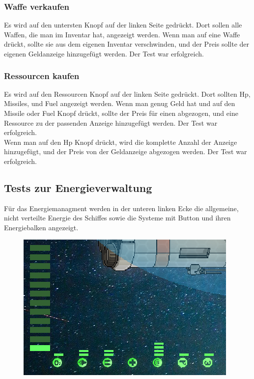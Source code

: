 \documentclass[fontsize=12pt,paper=a4,twoside]{scrartcl}
\begin{document}
\subsubsection{Waffe verkaufen}
Es wird auf den untersten Knopf auf der linken Seite gedrückt. Dort sollen alle Waffen, die man im Inventar hat, angezeigt werden. Wenn man auf eine Waffe drückt, sollte sie aus dem eigenen Inventar verschwinden, und der Preis sollte der eigenen Geldanzeige hinzugefügt werden.  Der Test war erfolgreich. \\
\subsubsection{Ressourcen kaufen}
Es wird auf den Ressourcen Knopf auf der linken Seite gedrückt. Dort sollten Hp, Missiles, und Fuel angezeigt werden. Wenn man genug Geld hat und auf den Missile oder Fuel Knopf drückt, sollte der Preis für einen abgezogen, und eine Ressource zu der passenden Anzeige hinzugefügt werden.  Der Test war erfolgreich. \\
Wenn man auf den Hp Knopf drückt, wird die komplette Anzahl der Anzeige hinzugefügt, und der Preis von der Geldanzeige abgezogen werden.  Der Test war erfolgreich. \\



\subsection{Tests zur Energieverwaltung}
Für das Energiemanagment werden in der unteren linken Ecke die allgemeine, nicht verteilte Energie des Schiffes sowie die Systeme mit Button und ihren Energiebalken angezeigt. \\
\begin{figure}[h!]
\centering
\includegraphics[width=0.5\linewidth]{images/energy1.png}
\end{figure}
\end{document}
